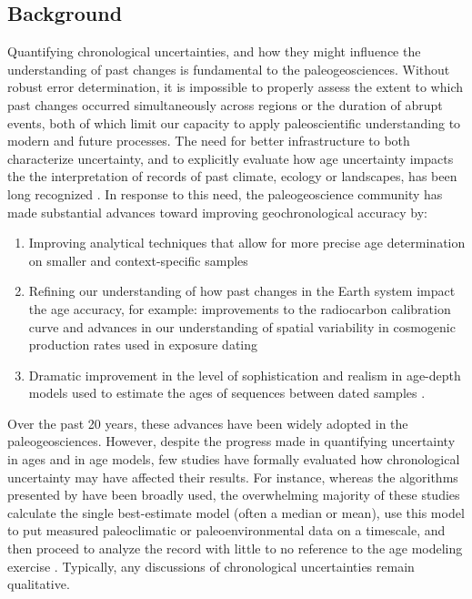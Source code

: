 \documentclass[gc, manuscript]{copernicus}
\begin{document}


\introduction

\subsection{Background}

Quantifying chronological uncertainties, and how they might influence
the understanding of past changes is fundamental to the
paleogeosciences. Without robust error determination, it is impossible
to properly assess the extent to which past changes occurred
simultaneously across regions or the duration of abrupt events, both of
which limit our capacity to apply paleoscientific understanding to
modern and future processes. The need for better infrastructure to both
characterize uncertainty, and to explicitly evaluate how age uncertainty
impacts the the interpretation of records of past climate, ecology or
landscapes, has been long recognized \citep[(more)]{Noren2013}. In
response to this need, the paleogeoscience community has made
substantial advances toward improving geochronological accuracy by:

\begin{enumerate}
\def\labelenumi{\arabic{enumi}.}
\item
  Improving analytical techniques that allow for more precise age
  determination on smaller and context-specific samples
  \citep[\citet{Eglinton96},\citet{Fifield2000},\citet{Eggins2005},\citet{Santos_blank_2010}]{Brown_radiocarbon89}
\item
  Refining our understanding of how past changes in the Earth system
  impact the age accuracy, for example: improvements to the radiocarbon
  calibration curve \citep[\citet{Stuiver98},intcal
  references]{Stuiver91} and advances in our understanding of spatial
  variability in cosmogenic production rates used in exposure dating
  \citep[\citet{Masarik2009}]{Balco2009}
\item
  Dramatic improvement in the level of sophistication and realism in
  age-depth models used to estimate the ages of sequences between dated
  samples \citep[e.g.][\citet{parnell2008flexible},
  \citet{Blaauw2010CLAM}, \citet{Blaauw2011BACON}]{Ramsey2009Bayesian}.
\end{enumerate}

Over the past 20 years, these advances have been widely adopted in the
paleogeosciences. However, despite the progress made in quantifying
uncertainty in ages and in age models, few studies have formally
evaluated how chronological uncertainty may have affected their results.
For instance, whereas the algorithms presented by
\citep[\citet{parnell2008flexible}, \citet{Blaauw2010CLAM},
\citet{Blaauw2011BACON}]{Ramsey2009Bayesian} have been broadly used, the
overwhelming majority of these studies calculate the single
best-estimate model (often a median or mean), use this model to put
measured paleoclimatic or paleoenvironmental data on a timescale, and
then proceed to analyze the record with little to no reference to the
age modeling exercise \citep[\citet{McKay2009}]{McKay2008}. Typically,
any discussions of chronological uncertainties remain qualitative.
\end{document}
